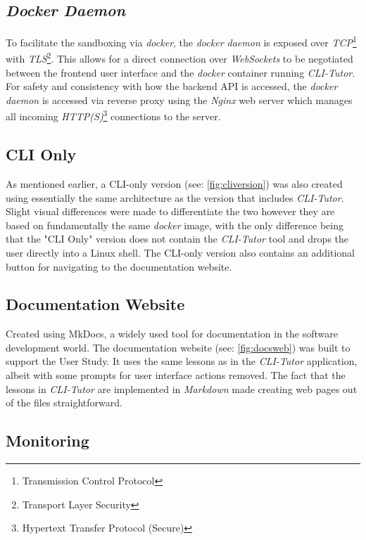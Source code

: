 \subsection{\textit{Docker Daemon}} To facilitate the sandboxing via
\textit{docker}, the \textit{docker daemon} is exposed over
\textit{TCP}\footnote{Transmission Control Protocol} with
\textit{TLS}\footnote{Transport Layer Security}. This allows for a direct
connection over \textit{WebSockets} to be negotiated between the frontend user
interface and the \textit{docker} container running \textit{CLI-Tutor}. For
safety and consistency with how the backend API is accessed, the \textit{docker
daemon} is accessed via reverse proxy using the \textit{Nginx} web server which
manages all incoming \textit{HTTP(S)}\footnote{Hypertext Transfer Protocol
(Secure)} connections to the server. 

 
\subsection{CLI Only} As mentioned earlier, a CLI-only version (see:
\autoref{fig:cliversion}) was also created using essentially the same
architecture as the version that includes \textit{CLI-Tutor}. Slight visual
differences were made to differentiate the two however they are based on
fundamentally the same \textit{docker} image, with the only difference being
that the "CLI Only" version does not contain the \textit{CLI-Tutor} tool and
drops the user directly into a Linux shell. The CLI-only version also contains
an additional button for navigating to the documentation website.

\subsection{Documentation Website} Created using MkDocs,\cite{mkdocs} a widely
used tool for documentation in the software development world. The
documentation website (see: \autoref{fig:docsweb}) was built to support the
User Study. It uses the same lessons as in the \textit{CLI-Tutor} application,
albeit with some prompts for user interface actions removed. The fact that the
lessons in \textit{CLI-Tutor} are implemented in \textit{Markdown} made
creating web pages out of the files straightforward.

\subsection{Monitoring}

